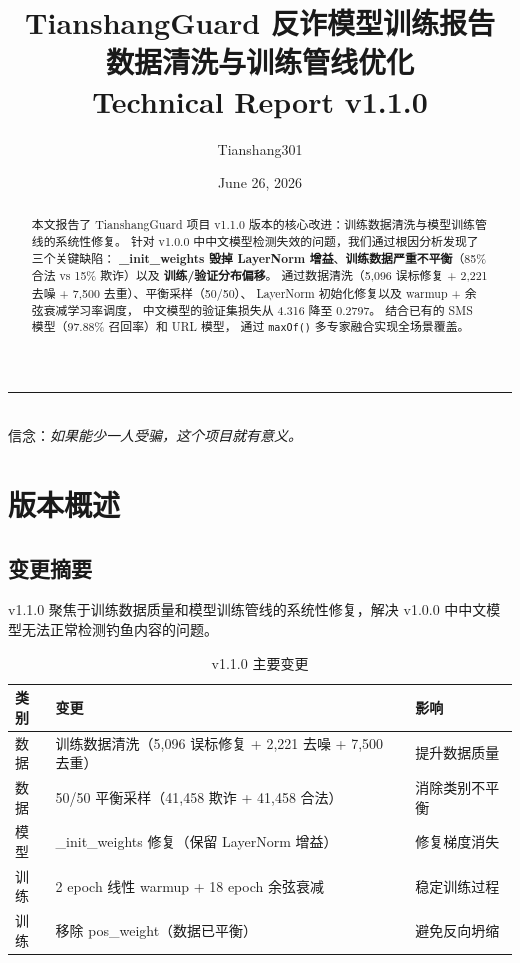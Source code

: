 \documentclass[11pt,a4paper]{article}
\title{\vspace{-2cm}
  {\LARGE\bfseries\color{primaryblue} TianshangGuard 反诈模型训练报告}\\[0.3cm]
  {\large 数据清洗与训练管线优化}\\[0.2cm]
  {\normalsize Technical Report v1.1.0}
}
\author{Tianshang301}
\date{June 26, 2026}
\begin{document}
\maketitle
\thispagestyle{empty}

\begin{center}
\rule{0.618\textwidth}{0.5pt}\\[0.3cm]
{\small 信念：\textit{如果能少一人受骗，这个项目就有意义。}}
\end{center}

\vspace{0.5cm}

\begin{abstract}
本文报告了 TianshangGuard 项目 v1.1.0 版本的核心改进：训练数据清洗与模型训练管线的系统性修复。
针对 v1.0.0 中中文模型检测失效的问题，我们通过根因分析发现了三个关键缺陷：
\textbf{\_init\_weights 毁掉 LayerNorm 增益}、\textbf{训练数据严重不平衡}（85\% 合法 vs 15\% 欺诈）以及
\textbf{训练/验证分布偏移}。
通过数据清洗（5,096 误标修复 + 2,221 去噪 + 7,500 去重）、平衡采样（50/50）、
LayerNorm 初始化修复以及 warmup + 余弦衰减学习率调度，
中文模型的验证集损失从 4.316 降至 0.2797。
结合已有的 SMS 模型（97.88\% 召回率）和 URL 模型，
通过 \texttt{maxOf()} 多专家融合实现全场景覆盖。
\end{abstract}

\tableofcontents
\newpage

\section{版本概述}

\subsection{变更摘要}

v1.1.0 聚焦于训练数据质量和模型训练管线的系统性修复，解决 v1.0.0 中中文模型无法正常检测钓鱼内容的问题。

\begin{table}[H]
\centering
\caption{v1.1.0 主要变更}
\begin{tabular}{lll}
\toprule
类别 & 变更 & 影响 \\
\midrule
数据 & 训练数据清洗（5,096 误标修复 + 2,221 去噪 + 7,500 去重） & 提升数据质量 \\
数据 & 50/50 平衡采样（41,458 欺诈 + 41,458 合法） & 消除类别不平衡 \\
模型 & \_init\_weights 修复（保留 LayerNorm 增益） & 修复梯度消失 \\
训练 & 2 epoch 线性 warmup + 18 epoch 余弦衰减 & 稳定训练过程 \\
训练 & 移除 pos\_weight（数据已平衡） & 避免反向坍缩 \\
\bottomrule
\end{tabular}
\end{table}
\end{document}

